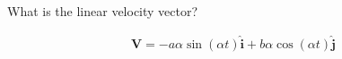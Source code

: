 What is the linear velocity vector?

\begin{solution}

\begin{align*}
    \boldsymbol{V} = -a \alpha \sin(\alpha t) \hat{\boldsymbol{i}} + b \alpha \cos(\alpha t) \hat{\boldsymbol{j}}
\end{align*}
\end{solution}